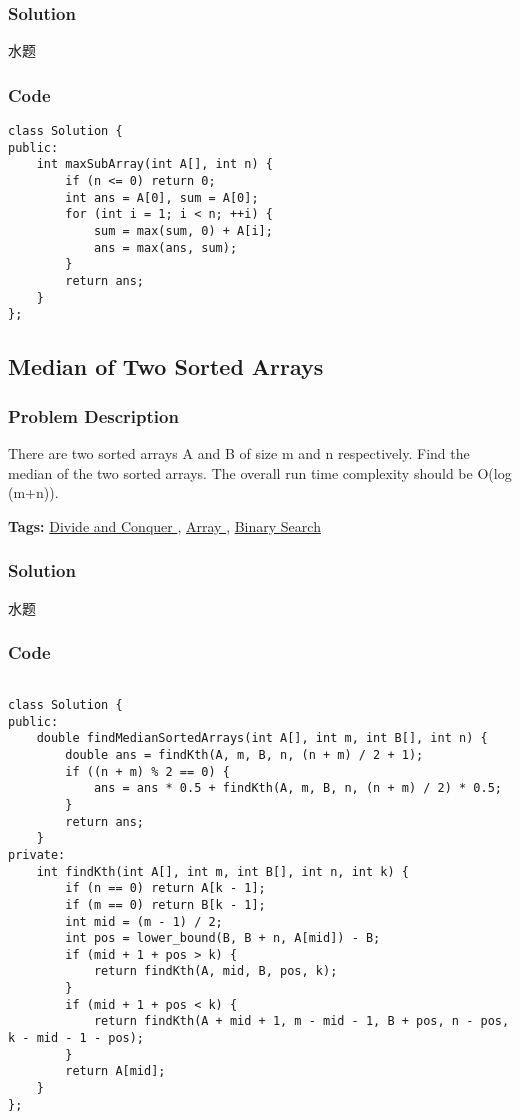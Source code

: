 \documentclass{article}
\begin{document}
\begin{CJK*}{UTF8}{gkai}
\subsubsection*{Solution}
水题

\subsubsection*{Code}
\begin{lstlisting}
class Solution {
public:
    int maxSubArray(int A[], int n) {
        if (n <= 0) return 0;
        int ans = A[0], sum = A[0];
        for (int i = 1; i < n; ++i) {
            sum = max(sum, 0) + A[i];
            ans = max(ans, sum);
        }
        return ans;
    }
}; 
\end{lstlisting}


\subsection{ Median of Two Sorted Arrays }
\label{ Median of Two Sorted Arrays }

\subsubsection*{Problem Description}
There are two sorted arrays A and B of size m and n respectively. Find the median of the two sorted arrays. The overall run time complexity should be O(log (m+n)).


\textbf{Tags: }
\hyperref[ Divide and Conquer ]{ Divide and Conquer },  \hyperref[ Array ]{ Array },  \hyperref[ Binary Search ]{ Binary Search }



\subsubsection*{Solution}
水题

\subsubsection*{Code}
\begin{lstlisting}

class Solution {
public:
    double findMedianSortedArrays(int A[], int m, int B[], int n) {
        double ans = findKth(A, m, B, n, (n + m) / 2 + 1);
        if ((n + m) % 2 == 0) {
            ans = ans * 0.5 + findKth(A, m, B, n, (n + m) / 2) * 0.5;
        }
        return ans;
    }
private:
    int findKth(int A[], int m, int B[], int n, int k) {
        if (n == 0) return A[k - 1];
        if (m == 0) return B[k - 1];
        int mid = (m - 1) / 2;
        int pos = lower_bound(B, B + n, A[mid]) - B;
        if (mid + 1 + pos > k) {
            return findKth(A, mid, B, pos, k);
        }
        if (mid + 1 + pos < k) {
            return findKth(A + mid + 1, m - mid - 1, B + pos, n - pos, k - mid - 1 - pos);
        }
        return A[mid];
    }
};


\end{lstlisting}
\end{CJK*}
\end{document}
